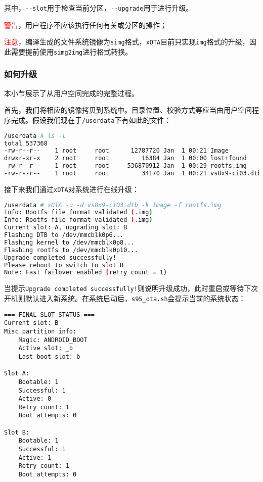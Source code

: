 \documentclass[UTF8]{ctexart}
\newcommand{\code}[1]{\colorbox{gray!10}{\lstinline[style=inlinecode]|#1|}}
\begin{document}
\noindent 其中，\code{--slot}用于检查当前分区，\code{--upgrade}用于进行升级。

\textcolor{red}{警告}，用户程序不应该执行任何有关或分区的操作；

\textcolor{red}{注意}，编译生成的文件系统镜像为\code{simg}格式，\code{xOTA}目前只实现\code{img}格式的升级，因此需要提前使用\code{simg2img}进行格式转换。

\subsubsection{如何升级}

本小节展示了从用户空间完成的完整过程。

首先，我们将相应的镜像拷贝到系统中。目录位置、校验方式等应当由用户空间程序完成。假设我们现在于\code{/userdata}下有如此的文件：

\begin{lstlisting}[language=sh]
/userdata # ls -l
total 537368
-rw-r--r--    1 root     root      12787720 Jan  1 00:21 Image
drwxr-xr-x    2 root     root         16384 Jan  1 00:00 lost+found
-rw-r--r--    1 root     root     536870912 Jan  1 00:29 rootfs.img
-rw-r--r--    1 root     root         34170 Jan  1 00:21 vs8x9-ci03.dtb     
\end{lstlisting}

接下来我们通过\code{xOTA}对系统进行在线升级：

\begin{lstlisting}[language=sh]
/userdata # xOTA -u -d vs8x9-ci03.dtb -k Image -f rootfs.img 
Info: Rootfs file format validated (.img)
Info: Rootfs file format validated (.img)
Current slot: A, upgrading slot: B
Flashing DTB to /dev/mmcblk0p6...
Flashing kernel to /dev/mmcblk0p8...
Flashing rootfs to /dev/mmcblk0p10...
Upgrade completed successfully!
Please reboot to switch to slot B
Note: Fast failover enabled (retry count = 1)    
\end{lstlisting}

当提示\code{Upgrade completed successfully!}则说明升级成功，此时重启或等待下次开机则默认进入新系统。在系统启动后，\code{s95_ota.sh}会提示当前的系统状态：

\begin{lstlisting}
=== FINAL SLOT STATUS ===
Current slot: B
Misc partition info:
    Magic: ANDROID_BOOT
    Active slot: _b
    Last boot slot: b

Slot A:
    Bootable: 1
    Successful: 1
    Active: 0
    Retry count: 1
    Boot attempts: 0

Slot B:
    Bootable: 1
    Successful: 1
    Active: 1
    Retry count: 1
    Boot attempts: 0        
\end{lstlisting}
\end{document}
